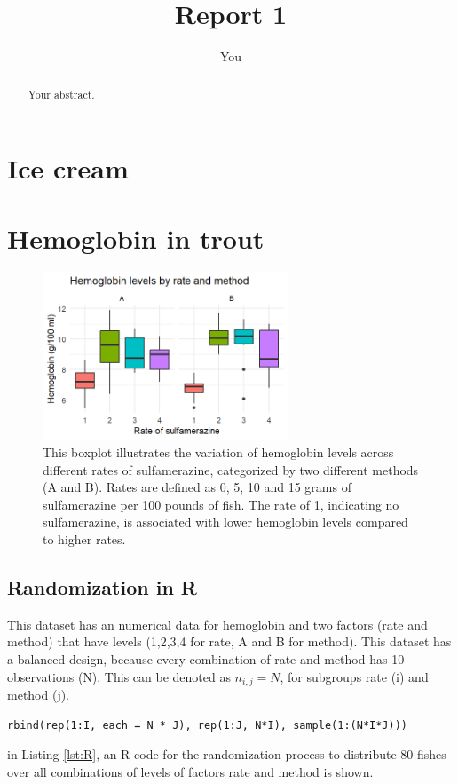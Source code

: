 \documentclass{article}
\title{Report 1}
\author{You}
\begin{document}
\maketitle

\begin{abstract}
Your abstract.
\end{abstract}

\section{Ice cream}


\section{Hemoglobin in trout}

\begin{figure}[h]
    \centering
    \includegraphics[height=5cm]{BoxplotHemoglobin.png}
    \caption{This boxplot illustrates the variation of hemoglobin levels across different rates of sulfamerazine, categorized by two different methods (A and B). Rates are defined as 0, 5, 10 and 15 grams of sulfamerazine per 100 pounds of fish. The rate of 1, indicating no sulfamerazine, is associated with lower hemoglobin levels compared to higher rates. }
    \label{fig:boxHem}
\end{figure}

\subsection{Randomization in R}
This dataset has an numerical data for hemoglobin and two factors (rate and method) that have levels (1,2,3,4 for rate, A and B for method). This dataset has a balanced design, because every combination of rate and method has 10 observations (N). This can be denoted as $n_{i,j} = N$, for subgroups rate (i) and method (j).
\begin{lstlisting}[caption="Randomization in R",label={lst:R}]
    rbind(rep(1:I, each = N * J), rep(1:J, N*I), sample(1:(N*I*J)))
\end{lstlisting}
in Listing \ref{lst:R}, an R-code for the randomization process to distribute 80 fishes over all combinations of levels of factors rate and method is shown.
\end{document}
